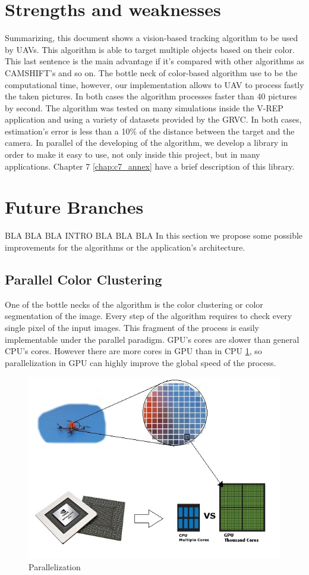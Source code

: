 \section{Strengths and weaknesses}
	Summarizing, this document shows a vision-based tracking algorithm to be used by UAVs. This algorithm is able to target multiple objects based on their color. This last sentence is the main advantage if it's compared with other algorithms as CAMSHIFT's \cite{blablacam} and so on. The bottle neck of color-based algorithm use to be the computational time, however, our implementation allows to UAV to process fastly the taken pictures. In both cases the algorithm processes faster than 40 pictures by second.
	The algorithm was tested on many simulations inside the V-REP application and using a variety of datasets provided by the GRVC. In both cases, estimation's error is less than a 10\% of the distance between the target and the camera.
	In parallel of the developing of the algorithm, we develop a library in order to make it easy to use, not only inside this project, but in many applications. Chapter 7 \ref{chap:c7_annex} have a brief description of this library.
	
	
\section{Future Branches}
	BLA BLA BLA INTRO BLA BLA BLA
	In this section we propose some possible improvements for the algorithms or the application's architecture.
	
	\subsection{Parallel Color Clustering}
	One of the bottle necks of the algorithm is the color clustering or color segmentation of the image. Every step of the algorithm requires to check every single pixel of the input images. This fragment of the process is easily implementable under the parallel paradigm.
	GPU's cores are slower than general CPU's cores. However there are more cores in GPU than in CPU \ref{fig:gpu}, so parallelization in GPU can highly improve the global speed of the process.
	
		
	\begin{figure}[ph]
		\centering
		\includegraphics[width=0.7\linewidth]{../Images/c5/gpu}
		\caption{Parallelization}
		\label{fig:gpu}
	\end{figure}


